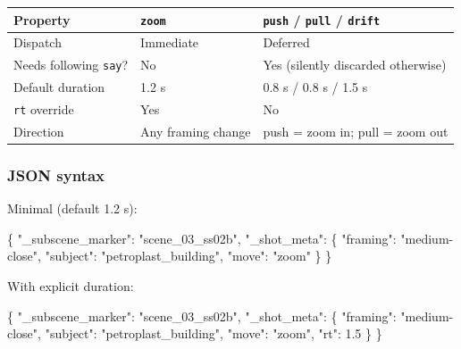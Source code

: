 \documentclass[
  12pt,
  letterpaper,
]{book}
\newenvironment{Shaded}{}{}
\newcommand{\DataTypeTok}[1]{\textcolor[rgb]{0.56,0.13,0.00}{#1}}
\newcommand{\FloatTok}[1]{\textcolor[rgb]{0.25,0.63,0.44}{#1}}
\newcommand{\FunctionTok}[1]{\textcolor[rgb]{0.02,0.16,0.49}{#1}}
\newcommand{\NormalTok}[1]{#1}
\newcommand{\StringTok}[1]{\textcolor[rgb]{0.25,0.44,0.63}{#1}}
\begin{document}
\begin{longtable}[]{@{}lll@{}}
\toprule\noalign{}
Property & \texttt{zoom} & \texttt{push} / \texttt{pull} / \texttt{drift} \\
\midrule\noalign{}
\endhead
\bottomrule\noalign{}
\endlastfoot
Dispatch & Immediate & Deferred \\
Needs following \texttt{say}? & No & Yes (silently discarded otherwise) \\
Default duration & 1.2 s & 0.8 s / 0.8 s / 1.5 s \\
\texttt{rt} override & Yes & No \\
Direction & Any framing change & push = zoom in; pull = zoom out \\
\end{longtable}

\subsubsection{JSON syntax}\label{zoom-json-syntax}

Minimal (default 1.2 s):

\begin{Shaded}
\begin{Highlighting}[]
\FunctionTok{\{}
\NormalTok{  }\DataTypeTok{"\_subscene\_marker"}\NormalTok{: }\StringTok{"scene\_03\_ss02b"}\NormalTok{,}
\NormalTok{  }\DataTypeTok{"\_shot\_meta"}\NormalTok{: \{}
\NormalTok{    }\DataTypeTok{"framing"}\NormalTok{:  }\StringTok{"medium-close"}\NormalTok{,}
\NormalTok{    }\DataTypeTok{"subject"}\NormalTok{:  }\StringTok{"petroplast\_building"}\NormalTok{,}
\NormalTok{    }\DataTypeTok{"move"}\NormalTok{:     }\StringTok{"zoom"}
\NormalTok{  \}}
\FunctionTok{\}}
\end{Highlighting}
\end{Shaded}

With explicit duration:

\begin{Shaded}
\begin{Highlighting}[]
\FunctionTok{\{}
\NormalTok{  }\DataTypeTok{"\_subscene\_marker"}\NormalTok{: }\StringTok{"scene\_03\_ss02b"}\NormalTok{,}
\NormalTok{  }\DataTypeTok{"\_shot\_meta"}\NormalTok{: \{}
\NormalTok{    }\DataTypeTok{"framing"}\NormalTok{:  }\StringTok{"medium-close"}\NormalTok{,}
\NormalTok{    }\DataTypeTok{"subject"}\NormalTok{:  }\StringTok{"petroplast\_building"}\NormalTok{,}
\NormalTok{    }\DataTypeTok{"move"}\NormalTok{:     }\StringTok{"zoom"}\NormalTok{,}
\NormalTok{    }\DataTypeTok{"rt"}\NormalTok{:       }\FloatTok{1.5}
\NormalTok{  \}}
\FunctionTok{\}}
\end{Highlighting}
\end{Shaded}
\end{document}
